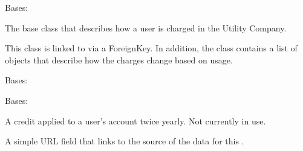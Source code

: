 \documentclass[letterpaper,10pt,english]{sphinxmanual}
\begin{document}

\begin{fulllineitems}
\label{modules/webapp:webapp.models.RatePlan}
Bases: 

The base class that describes how a user is charged in the Utility Company.

This class is linked to {\hyperref[modules/webapp:webapp.models.UtilityCompany]{\emph{}}} via a ForeignKey.
In addition, the class contains a list of {\hyperref[modules/webapp:webapp.models.Tier]{\emph{}}} objects
that describe how the charges change based on usage.

\begin{fulllineitems}
\label{modules/webapp:webapp.models.RatePlan.DoesNotExist}
Bases: 

\end{fulllineitems}


\begin{fulllineitems}
\label{modules/webapp:webapp.models.RatePlan.MultipleObjectsReturned}
Bases: 

\end{fulllineitems}


\begin{fulllineitems}
\label{modules/webapp:webapp.models.RatePlan.california_climate_credit}
A credit applied to a user's account twice yearly. Not currently in use.

\end{fulllineitems}


\begin{fulllineitems}
\label{modules/webapp:webapp.models.RatePlan.data_source}
A simple URL field that links to the source of the data for this {\hyperref[modules/webapp:webapp.models.RatePlan]{\emph{}}}.


\end{fulllineitems}
\end{fulllineitems}
\end{document}
